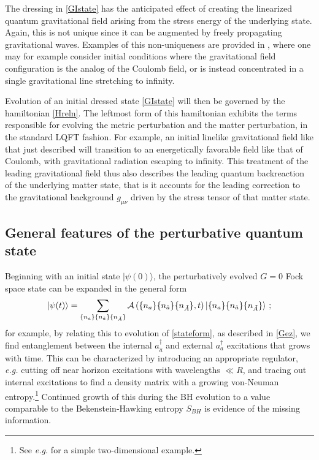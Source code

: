 \documentclass[12pt]{article}
\numberwithin{equation}{section}
\newcommand{\cala}{{\cal A}}
\newcommand{\beq}{\begin{equation}}
\newcommand{\eeq}{\end{equation}}
\begin{document}
The dressing in \eqref{GIstate} has the anticipated effect of creating the linearized quantum gravitational field arising from the stress energy of the underlying state.  Again, this is not unique since it can be augmented by freely propagating gravitational waves.  Examples of this non-uniqueness are provided in \cite{DoGi1}, where one may for example consider initial conditions where the gravitational field configuration is the analog of the Coulomb field, or is instead concentrated in a single gravitational line stretching to infinity.

Evolution of an initial dressed state \eqref{GIstate} will then be governed by the hamiltonian \eqref{Hreln}.  The leftmost form of this hamiltonian exhibits the terms responsible for evolving the metric perturbation and the matter perturbation, in the standard LQFT fashion.  For example, an initial linelike gravitational field like that just described will transition to an energetically favorable field like that of Coulomb, with gravitational radiation escaping to infinity.  This treatment of the leading gravitational field thus also describes the leading quantum backreaction of the underlying matter state, that is it accounts for the leading correction to the gravitational background $g_{\mu\nu}$ driven by the stress tensor of that matter state.



\subsection{General features of the perturbative quantum state}

Beginning with an initial state $|\psi(0)\rangle$, the perturbatively evolved $G=0$ Fock space state can be expanded in the general form 
\beq \label{matstate}
|\psi(t)\rangle = \sum_{\{n_a\}\{n_{\hat a}\}\{n_{\tilde A}\}} \cala\left({\{n_a\}\{n_{\hat a}\}\{n_{\tilde A}\}},t\right)|{\{n_a\}\{n_{\hat a}\}\{n_{\tilde A}\}}\rangle\ ;
\eeq
for example, by relating this to evolution of \eqref{stateform}, as described in \ref{Gez}, we find entanglement between the internal $a^\dagger_{\hat a}$ and external 
$a^\dagger_{a}$ excitations that grows with time.  This can be characterized by introducing an appropriate regulator, {\it e.g.} cutting off near horizon excitations with wavelengths $\ll R$, and tracing out internal excitations to find a density matrix with a growing von-Neuman entropy.\footnote{See {\it e.g.} \cite{GiNe} for a simple two-dimensional example.}  Continued growth of this during the BH evolution to a value comparable to the Bekenstein-Hawking entropy $S_{BH}$ is evidence of the missing information.
\end{document}
